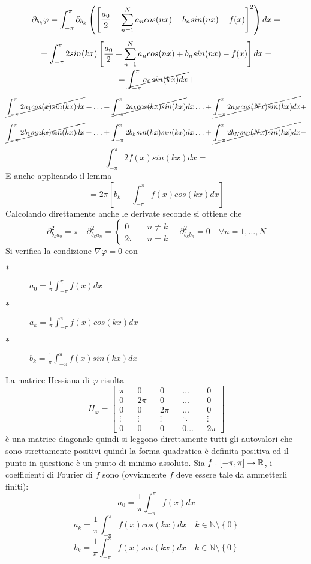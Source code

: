 $$\partial_{b_k}\varphi = \int_{-\pi}^{\pi}\partial_{b_k}\left(\left[\frac{a_0}{2}+\sum\limits_{n=1}^{N}a_{n}cos(nx)+b_{n}sin(nx)-f(x)\right]^2\right)dx=$$
$$ = \int_{-\pi}^{\pi} 2sin(kx) \left[\frac{a_0}{2}+\sum\limits_{n=1}^{N}a_{n}cos(nx)+b_{n}sin(nx)-f(x)\right]dx=$$
$$ =  \cancel{\int_{-\pi}^{\pi} a_0sin(kx)dx} + $$
$$\cancel{\int_{-\pi}^{\pi} 2a_1cos(x)sin(kx)dx} +
\ldots + 
\cancel{\int_{-\pi}^{\pi} 2a_kcos(kx)sin(kx)}dx
\ldots + 
\cancel{\int_{-\pi}^{\pi} 2a_Ncos(Nx)sin(kx)dx} + $$
$$\cancel{\int_{-\pi}^{\pi} 2b_1sin(x)sin(kx)dx} +
\ldots + 
\int_{-\pi}^{\pi} 2b_ksin(kx)sin(kx)dx
\ldots + 
\cancel{\int_{-\pi}^{\pi} 2b_Nsin(Nx)sin(kx)dx} - $$
$$\int_{-\pi}^{\pi} 2f(x)sin(kx)dx = $$
E anche applicando il lemma
$$=2\pi\left[b_k-\int_{-\pi}^{\pi}f(x)cos(kx)dx\right]$$
Calcolando direttamente anche le derivate seconde si ottiene che
$$\partial^2_{b_ka_0}=\pi\quad\partial^2_{b_ka_n}=
\left\{\begin{matrix}
0&&n\ne k\\2\pi&&n=k
\end{matrix}\right.
\quad\partial^2_{b_kb_n}=0\quad\forall n=1,\ldots,N$$
Si verifica la condizione $\nabla\varphi = 0$ con
\begin{description}
	\item[$\ast$] $a_0=\frac{1}{\pi}\int_{-\pi}^{\pi}f(x)dx$
	\item[$\ast$] $a_k=\frac{1}{\pi}\int_{-\pi}^{\pi}f(x)cos(kx)dx$
	\item[$\ast$] $b_k=\frac{1}{\pi}\int_{-\pi}^{\pi}f(x)sin(kx)dx$
\end{description}
La matrice Hessiana di $\varphi$ risulta $$H_{\varphi}=\left[\begin{matrix}
\pi&&0&&0&&\ldots&&0\\
0&&2\pi&&0&&\ldots&&0\\
0&&0&&2\pi&&\ldots&&0\\
\vdots&&\vdots&&\vdots&&\ddots&&\vdots\\
0&&0&&0&&0\ldots&&2\pi
\end{matrix}\right]$$
è una matrice diagonale quindi si leggono direttamente tutti gli autovalori che sono strettamente positivi quindi la forma quadratica è definita positiva ed il punto in questione è un punto di minimo assoluto.
Sia $f:\left[-\pi,\pi\right]\to \mathbb{R}$, i coefficienti di Fourier di $f$ sono (ovviamente $f$ deve essere tale da ammetterli finiti):
$$a_0=\frac{1}{\pi}\int_{-\pi}^{\pi}f(x)dx$$
$$a_k=\frac{1}{\pi}\int_{-\pi}^{\pi}f(x)cos(kx)dx\quad k\in\mathbb{N}\setminus{\left\{0\right\}}$$
$$b_k=\frac{1}{\pi}\int_{-\pi}^{\pi}f(x)sin(kx)dx\quad k\in\mathbb{N}\setminus{\left\{0\right\}}$$
